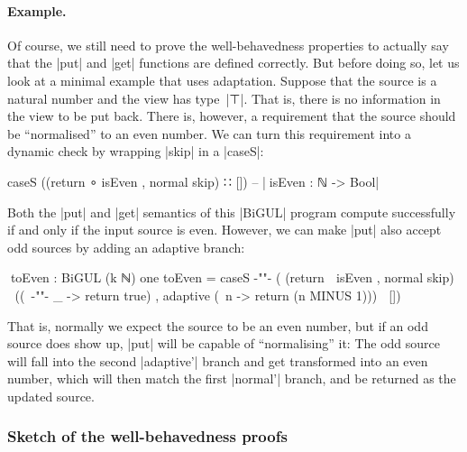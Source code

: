 \documentclass{sigplanconf}
\begin{document}
\paragraph{Example.}
Of course, we still need to prove the well-behavedness properties to actually say that the |put| and |get| functions are defined correctly.
But before doing so, let us look at a minimal example that uses adaptation.
Suppose that the source is a natural number and the view has type~|⊤|.
That is, there is no information in the view to be put back.
There is, however, a requirement that the source should be ``normalised'' to an even number.
We can turn this requirement into a dynamic check by wrapping |skip| in a |caseS|:
\begin{code}
caseS ((return ∘ isEven , normal skip) ∷ [])
  -- |^^^isEven : ℕ -> Bool|
\end{code}
Both the |put| and |get| semantics of this |BiGUL| program compute successfully if and only if the input source is even.
However, we can make |put| also accept odd sources by adding an adaptive branch:
\begin{code}
^^^toEven : BiGUL (k ℕ) one
toEven = caseS
  {-"\!\!"-} (  (return ∘ isEven                , normal    skip) ∷
                ((\ {-"\!"-} _ -> return true)  , adaptive  (\ n -> return (n MINUS 1))) ∷ [])
\end{code}
That is, normally we expect the source to be an even number, but if an odd source does show up, |put| will be capable of ``normalising'' it: The odd source will fall into the second |adaptive'| branch and get transformed into an even number, which will then match the first |normal'| branch, and be returned as the updated source.

\subsubsection{Sketch of the well-behavedness proofs}
\end{document}
